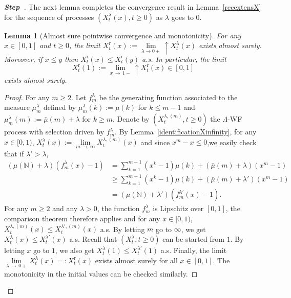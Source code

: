 \documentclass[10pt]{amsart}
\newtheorem{lemm}[theo]{Lemma}\newtheorem{prop}[theo]{Proposition}\newtheorem{coro}[theo]{Corollary}\newtheorem{conj}[theo]{Conjecture}
\theoremstyle{definition}\newtheorem{defi}[theo]{Definition}\newtheorem{rema}[theo]{Remark}\newtheorem{exam}[theo]{Example}\newtheorem{exem}[theo]{Example}\newtheorem{nota}[theo]{Notation}
\newcommand{\rmr}{\mathrm{r}}
\newcommand{\bbN}{\mathbb{N}}
\newcounter{stepcount}
\newenvironment{step}{\refstepcounter{stepcount}\begin{proof}[\textbf{Step~\thestepcount}]}{\end{proof}}
\begin{document}
\begin{step}
The next lemma completes the convergence result in Lemma~\ref{recextensX} for the sequence of processes $(X^{\lambda}_t(x),t\geq 0)$ as $\lambda$ goes to $0$.
\begin{lemm}[Almost sure pointwise convergence and monotonicity]\label{almostsureinx}
For any $x\in [0,1]$ and $t\geq 0$, the limit $X^{\rmr}_t(x):=\underset{\lambda \rightarrow 0+}{\lim}\! \uparrow X_t^{\lambda}(x)$ exists almost surely. Moreover, if $x\leq y$ then $X_t^{\rmr}(x)\leq X_t^{\rmr}(y)$ a.s. In particular, the limit
\[
X_t^{\rmr}(1):=\underset{x\,\rightarrow\,1-}{\lim}\! \uparrow X_t^{\rmr}(x)\in [0,1]
\]
exists almost surely.
\end{lemm}

\begin{proof}
For any $m\geq 2$. Let $f^{\lambda}_m$ be the generating function associated to the measure $\mu^{\lambda}_m$ defined by $\mu^{\lambda}_m(k):=\mu(k)$ for $k\leq m-1$ and $\mu^{\lambda}_m(m):=\bar\mu(m)+\lambda$ for $k\geq m$. Denote by $(X_t^{\lambda,(m)},t\geq 0)$ the $\Lambda$-WF process with selection driven by $f^{\lambda}_m$. By Lemma~\ref{identificationXinfinity}, for any $x\in [0,1)$, $X_t^{\lambda}(x):=\underset{m\,\rightarrow\,\infty}{\lim} X_t^{\lambda,(m)}(x)$ and since $x^{m}-x\leq 0$,\linebreak we easily check that if $\lambda'>\lambda$,
\begin{align*}
(\mu(\bbN)+\lambda)\left(f_{m}^{\lambda}(x)-1\right)&=\sum_{k=1}^{m-1}(x^k-1)\mu(k)+(\bar{\mu}(m)+\lambda)(x^{m}-1)\\
&\geq \sum_{k=1}^{m-1}(x^k-1)\mu(k)+(\bar{\mu}(m)+\lambda')(x^{m}-1)\\
&=(\mu(\bbN)+\lambda')\left(f_{m}^{\lambda'}(x)-1\right).
\end{align*}
For any $m\geq 2$ and any $\lambda>0$, the function $f_{m}^{\lambda}$ is Lipschitz over $[0,1]$, the comparison theorem therefore applies and for any $x\in [0,1)$, $X_t^{\lambda,(m)}(x)\leq X_t^{\lambda',(m)}(x)$ a.s. By letting $m$ go to $\infty$, we get $X_t^{\lambda}(x)\leq X_t^{\lambda'}(x)$ a.s. Recall that $(X^{\lambda}_t,t\geq 0)$ can be started from $1$. By letting $x$ go to $1$, we also get $X_t^{\lambda}(1)\leq X_t^{\lambda'}(1)$ a.s. Finally, the limit $\underset{\lambda\,\rightarrow\,0+}{\lim} X_t^{\lambda}(x)=:X_t^{\rmr}(x)$ exists almost surely for all $x\in [0,1]$. The monotonicity in the initial values can be checked similarly.
\end{proof}\let\qed\relax
\end{step}
\vspace*{4pt}
\end{document}
